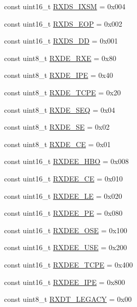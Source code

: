 \begin{DoxyCompactItemize}
\item 
const uint16\_\-t \hyperlink{namespaceiGbReg_aafdc831ca3b4b37ff432587453d386f6}{RXDS\_\-IXSM} = 0x004
\item 
const uint16\_\-t \hyperlink{namespaceiGbReg_a4bf1dbf21e11b2b4709870ea28923795}{RXDS\_\-EOP} = 0x002
\item 
const uint16\_\-t \hyperlink{namespaceiGbReg_ad96ccac73daaa7c0f55a9f2ef4c3d1fd}{RXDS\_\-DD} = 0x001
\item 
const uint8\_\-t \hyperlink{namespaceiGbReg_aaced21efb464d65f048dcbc75508d930}{RXDE\_\-RXE} = 0x80
\item 
const uint8\_\-t \hyperlink{namespaceiGbReg_a0e09666185341c08fbc3e424f552eabf}{RXDE\_\-IPE} = 0x40
\item 
const uint8\_\-t \hyperlink{namespaceiGbReg_a620a2faa51faca3544031f54ced87ca3}{RXDE\_\-TCPE} = 0x20
\item 
const uint8\_\-t \hyperlink{namespaceiGbReg_a02358741d65ef3322dd25e1fe44bda83}{RXDE\_\-SEQ} = 0x04
\item 
const uint8\_\-t \hyperlink{namespaceiGbReg_a5825344f3dc6135dd18bedee9d37e0a3}{RXDE\_\-SE} = 0x02
\item 
const uint8\_\-t \hyperlink{namespaceiGbReg_a9d23f5244c1a11d88cb7b4fe715f2356}{RXDE\_\-CE} = 0x01
\item 
const uint16\_\-t \hyperlink{namespaceiGbReg_a3c7498480684ea5f18a6caff1489d9e1}{RXDEE\_\-HBO} = 0x008
\item 
const uint16\_\-t \hyperlink{namespaceiGbReg_aeb415972ea4ca7b155cc61d348ad2340}{RXDEE\_\-CE} = 0x010
\item 
const uint16\_\-t \hyperlink{namespaceiGbReg_a3dd2fffa1f4c31bd1267d65f74b0c7b2}{RXDEE\_\-LE} = 0x020
\item 
const uint16\_\-t \hyperlink{namespaceiGbReg_a6d2898616d7a90b9fba5e4437946e9d6}{RXDEE\_\-PE} = 0x080
\item 
const uint16\_\-t \hyperlink{namespaceiGbReg_a0a7430b12c397b22f981a44316185090}{RXDEE\_\-OSE} = 0x100
\item 
const uint16\_\-t \hyperlink{namespaceiGbReg_a05f322eff2b257ab4460b1df5ae85d80}{RXDEE\_\-USE} = 0x200
\item 
const uint16\_\-t \hyperlink{namespaceiGbReg_a4ddfc8191736dc4c822f86ff1b073ea4}{RXDEE\_\-TCPE} = 0x400
\item 
const uint16\_\-t \hyperlink{namespaceiGbReg_a7c6e9391f043fae210dac66022ccb0db}{RXDEE\_\-IPE} = 0x800
\item 
const uint8\_\-t \hyperlink{namespaceiGbReg_a6497536d5f701baf5ec692cd5f543c7b}{RXDT\_\-LEGACY} = 0x00

\end{DoxyCompactItemize}
